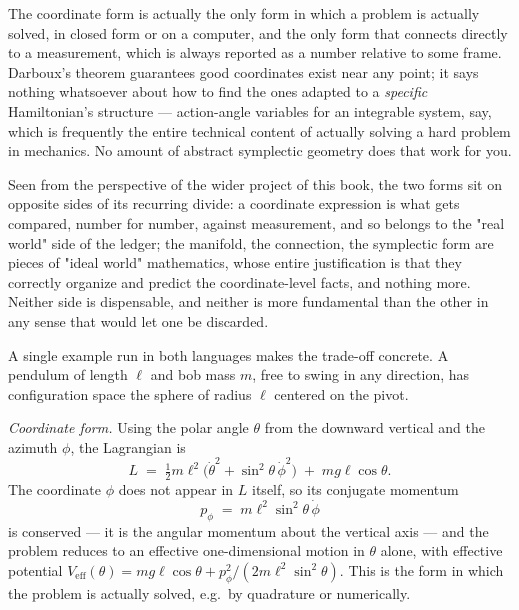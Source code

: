 The coordinate form is actually the only form in which a
problem is actually solved, in closed form or on a computer, and the
only form that connects directly to a measurement, which is always
reported as a number relative to some frame. Darboux's theorem
guarantees good coordinates exist near any point; it says nothing
whatsoever about how to find the ones adapted to a \emph{specific}
Hamiltonian's structure --- action-angle variables for an integrable
system, say, which is frequently the entire technical content of
actually solving a hard problem in mechanics. No amount of abstract
symplectic geometry does that work for you.

Seen from the perspective of the wider project of this book, the two
forms sit on opposite sides of its recurring divide: a coordinate
expression is what gets compared, number for number, against
measurement, and so belongs to the "real world" side of the ledger;
the manifold, the connection, the symplectic form are pieces of
"ideal world" mathematics, whose entire justification is that they
correctly organize and predict the coordinate-level facts, and
nothing more. Neither side is dispensable, and neither is more
fundamental than the other in any sense that would let one be
discarded.

A single example run in both languages makes the trade-off concrete.
A pendulum of length $\ell$ and bob mass $m$, free to swing in any
direction, has configuration space the sphere of radius $\ell$
centered on the pivot.

\emph{Coordinate form.} Using the polar angle $\theta$ from the
downward vertical and the azimuth $\phi$, the Lagrangian is
\begin{equation}
  L \;=\; \tfrac12 m\ell^2\bigl(\dot\theta^2 + \sin^2\theta\,
  \dot\phi^2\bigr) \;+\; mg\ell\cos\theta .
  \label{sph-pendulum-L}
\end{equation}
The coordinate $\phi$ does not appear in $L$ itself, so its conjugate
momentum
\begin{equation}
  p_\phi \;=\; m\ell^2\sin^2\theta\,\dot\phi
  \label{sph-pendulum-pphi}
\end{equation}
is conserved --- it is the angular momentum about the vertical axis
--- and the problem reduces to an effective one-dimensional motion in
$\theta$ alone, with effective potential $V_{\mathrm{eff}}(\theta) =
mg\ell\cos\theta + p_\phi^2/(2m\ell^2\sin^2\theta)$. This is the form
in which the problem is actually solved, e.g.\ by quadrature or
numerically.


